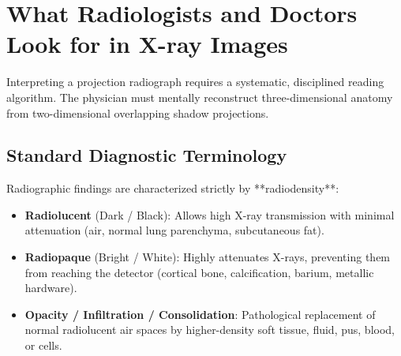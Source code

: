 \documentclass[11pt,a4paper]{article}
\begin{document}
\section{What Radiologists and Doctors Look for in X-ray Images}

Interpreting a projection radiograph requires a systematic, disciplined reading algorithm. The physician must mentally reconstruct three-dimensional anatomy from two-dimensional overlapping shadow projections.

\subsection{Standard Diagnostic Terminology}
Radiographic findings are characterized strictly by **radiodensity**:
\begin{itemize}[leftmargin=*]
    \item \textbf{Radiolucent} (Dark / Black): Allows high X-ray transmission with minimal attenuation (air, normal lung parenchyma, subcutaneous fat).
    \item \textbf{Radiopaque} (Bright / White): Highly attenuates X-rays, preventing them from reaching the detector (cortical bone, calcification, barium, metallic hardware).
    \item \textbf{Opacity / Infiltration / Consolidation}: Pathological replacement of normal radiolucent air spaces by higher-density soft tissue, fluid, pus, blood, or cells.
\end{itemize}
\end{document}
